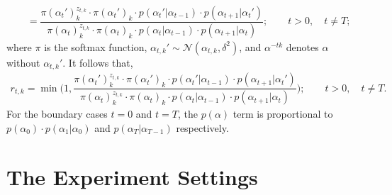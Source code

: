 \documentclass[12pt]{article}
\begin{document}
\begin{enumerate}
\begin{align*}
      &= \dfrac{\pi(\alpha_{t}')_k^{z_{t,k}}\cdot \pi(\alpha_{t}')_k\cdot p(\alpha_t'|\alpha_{t-1})\cdot p(\alpha_{t+1}|\alpha_t')}{\pi(\alpha_t)_k^{z_{t,k}}\cdot \pi(\alpha_{t})_k\cdot p(\alpha_t|\alpha_{t-1})\cdot p(\alpha_{t+1}|\alpha_t)}; \qquad t > 0, \quad t \neq T;
    \end{align*}
    where $\pi$ is the softmax function, $\alpha_{t,k}' \sim \mathcal{N}(\alpha_{t, k}, \delta^2)$, and $\alpha^{-tk}$ denotes $\alpha$ without $\alpha_{t,k}'$. It follows that,
    \begin{align*}
      r_{t,k} = \min{\bigg(1, \dfrac{\pi(\alpha_{t}')_k^{z_{t,k}}\cdot \pi(\alpha_{t}')_k\cdot p(\alpha_t'|\alpha_{t-1})\cdot p(\alpha_{t+1}|\alpha_t')}{\pi(\alpha_t)_k^{z_{t,k}}\cdot \pi(\alpha_{t})_k\cdot p(\alpha_t|\alpha_{t-1})\cdot p(\alpha_{t+1}|\alpha_t)}\bigg)}; \qquad t > 0, \quad t \neq T.
    \end{align*}
    For the boundary cases $t=0$ and $t=T$, the $p(\alpha)$ term is proportional to $p(\alpha_{0})\cdot p(\alpha_{1}|\alpha_{0})$ and $p(\alpha_{T}|\alpha_{T-1})$ respectively.


\end{enumerate}



\section*{The Experiment Settings}
\end{document}
